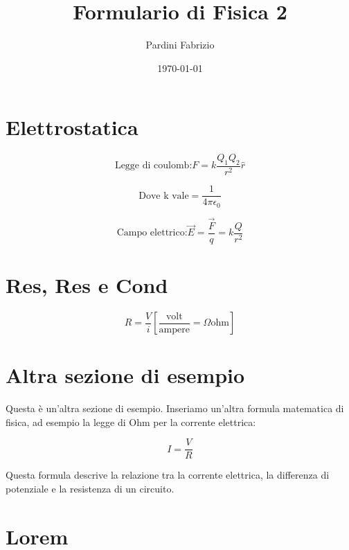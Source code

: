 \documentclass[a4paper,11pt]{article}
\begin{document}
	
	\setlength{\abovedisplayskip}{0pt}
	\setlength{\belowdisplayskip}{0pt}
	
	\title{\Large\bfseries Formulario di Fisica 2\vspace{-1em}}
	\author{Pardini Fabrizio\vspace{-1cm}}
	\date{\today\vspace{-1em}}
	\maketitle
	
	\begin{multicols}{3}
		\setlength{\columnseprule}{0.03pt}
		\def\columnseprulecolor{\color{black}}
		
		\section{Elettrostatica}
		
		
		\begin{equation}
			\text{Legge di coulomb:}F=k\frac{Q_{1}Q_{2}}{r^{2}}\hat{r}
		\end{equation}
	
		\begin{equation}
			\text{Dove k vale}=\frac{1}{4\pi\epsilon_{0}}
		\end{equation}
	
		
		\begin{equation}
			\text{Campo elettrico:}\vec{E}=\frac{\vec{F}}{q}=k\frac{Q}{r^{2}}
		\end{equation}
	
	
		\section{Res, Res e Cond}
		
		\begin{equation}
			R=\frac{V}{i} \left[\frac{\text{volt}}{\text{ampere}}=\Omega\text{ohm}\right]
		\end{equation}
	
	
		
		
		\section{Altra sezione di esempio}
		
		Questa è un'altra sezione di esempio. Inseriamo un'altra formula matematica di fisica, ad esempio la legge di Ohm per la corrente elettrica:
		
		\begin{equation}
			I=\frac{V}{R}
		\end{equation}
		
		Questa formula descrive la relazione tra la corrente elettrica, la differenza di potenziale e la resistenza di un circuito.
		
		
		\section{Lorem}
		\lipsum[1-20]
	\end{multicols}
	
\end{document}
